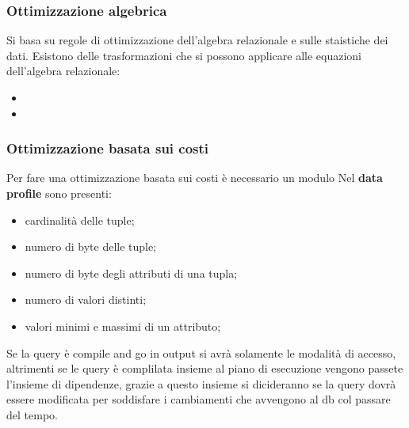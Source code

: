 \documentclass[12pt]{article}
\begin{document}
\subsubsection{Ottimizzazione algebrica}
Si basa su regole di ottimizzazione dell'algebra relazionale e sulle staistiche dei dati. Esistono delle trasformazioni che si possono applicare alle equazioni dell'algebra relazionale:
\begin{itemize}
    \item 
    \item 
\end{itemize}

\subsubsection{Ottimizzazione basata sui costi}
Per fare una ottimizzazione basata sui costi \`e necessario un modulo Nel \textbf{data profile} sono presenti:
\begin{itemize}
    \item cardinalit\`a delle tuple;
    \item numero di byte delle tuple;
    \item numero di byte degli attributi di una tupla;
    \item numero di valori distinti;
    \item valori minimi e massimi di un attributo;
\end{itemize}
Se la query \`e compile and go in output si avr\`a solamente le modalit\`a di accesso, altrimenti se le query \`e complilata insieme al piano di esecuzione vengono passete l'insieme di dipendenze, grazie a questo insieme si dicideranno se la query dovr\`a essere modificata per soddisfare i cambiamenti che avvengono al db col passare del tempo.
\end{document}

